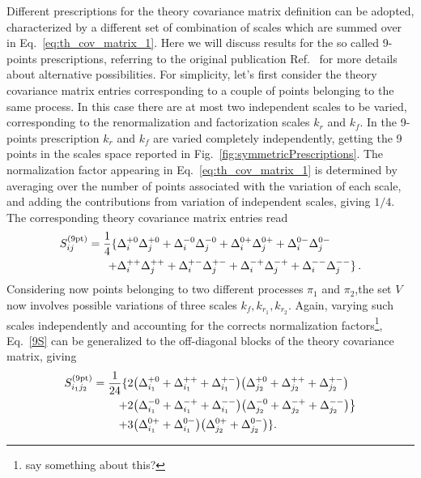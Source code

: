 %
Different prescriptions for the theory covariance matrix definition can be adopted, characterized by a different
set of combination of scales which are summed over in Eq.~\ref{eq:th_cov_matrix_1}.
Here we will discuss results for the so called 9-points prescriptions, referring to the original publication 
Ref.~\cite{AbdulKhalek:2020jut} for more details about alternative possibilities.
For simplicity, let's first consider the theory covariance matrix entries corresponding to 
a couple of points belonging to the same process. In this case there are at most two independent scales to be varied,
corresponding to the renormalization and factorization scales $k_r$ and $k_f$.
In the 9-points prescription $k_r$ and $k_f$ are varied completely independently, getting the 9 points in the 
scales space reported in Fig.~\ref{fig:symmetricPrescriptions}. The normalization factor appearing in Eq.~\ref{eq:th_cov_matrix_1}
is determined by averaging over the number of points associated with the variation of each scale, and adding the contributions from
variation of independent scales, giving $1/4$. The corresponding theory covariance matrix entries read
\begin{equation}
    \label{9S}
    \begin{split}
        S^{(\rm 9pt)}_{ij} = \frac{1}{4}\{ &\Delta_i^{+0} \Delta_j^{+0} + \Delta_i^{-0}\Delta_j^{-0}
                                + \Delta_i^{0+} \Delta_j^{0+} + \Delta_i^{0-}\Delta_j^{0-} \\
                                + &\Delta_i^{++}\Delta_j^{++} + \Delta_i^{+-} \Delta_j^{+-}
                                + \Delta_i^{-+}\Delta_j^{-+} + \Delta_i^{--} \Delta_j^{--} \} \, .
    \end{split}                            
\end{equation}
Considering now points belonging to two different processes $\pi_1$ and $\pi_2$,the set $V$ now involves 
possible variations of three scales $k_f,k_{r_1}, k_{r_2}$.
Again, varying such scales independently and accounting for the corrects normalization factors\footnote{say something about this?},
Eq.~\ref{9S} can be generalized to the off-diagonal blocks of the theory covariance matrix, giving
\begin{equation}\label{9M}
\begin{split}
    S^{(\rm 9pt)}_{i_1j_2} =
    \frac{1}{24}\{&2\big(\Delta_{i_1}^{+0}+\Delta_{i_1}^{++}
    + \Delta_{i_1}^{+-}\big) \big(\Delta_{j_2}^{+0} +
    \Delta_{j_2}^{++} + \Delta_{j_2}^{+-} \big) \\ 
            + &2\big(\Delta_{i_1}^{-0} + \Delta_{i_1}^{-+} +
            \Delta_{i_1}^{--}\big)\big(\Delta_{j_2}^{-0} +
            \Delta_{j_2}^{-+} + \Delta_{j_2}^{--} \big) \big\}\\ 
            + &3\big(\Delta_{i_1}^{0+}+ \Delta_{i_1}^{0-}\big)\big(\Delta_{j_2}^{0+} + \Delta_{j_2}^{0-} \big)\}.
\end{split}            
\end{equation}

